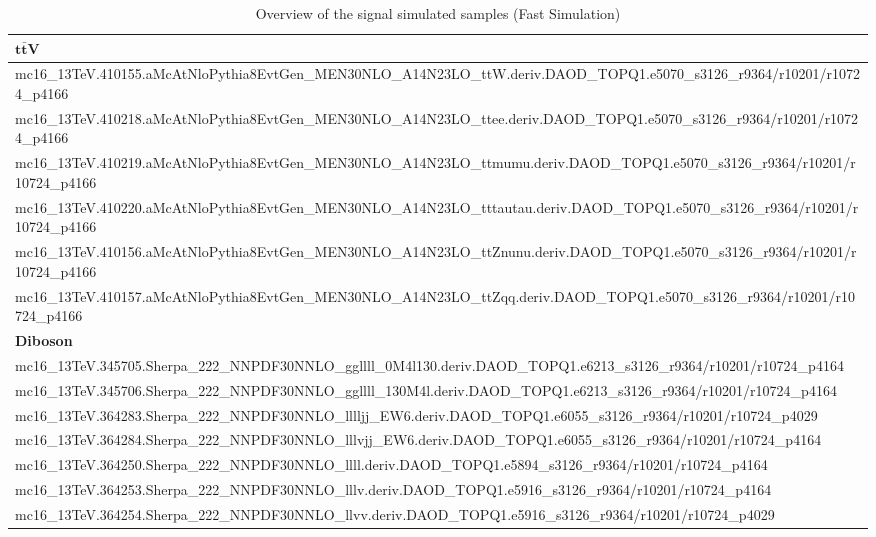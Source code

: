	\begin{table}[htbp]
	\caption {Overview of the signal simulated samples (Fast Simulation)}
	\label{tab:mc_bkg_nom}
		\notsotiny
		\centering
	\begin{adjustwidth}{-0.6cm}{}
			\begin{tabular}{l}
			\toprule	
			$\mathbf{t\bar{t}V}$ \\
			\hline
			mc16\_13TeV.410155.aMcAtNloPythia8EvtGen\_MEN30NLO\_A14N23LO\_ttW.deriv.DAOD\_TOPQ1.e5070\_s3126\_r9364/r10201/r10724\_p4166 \\
			mc16\_13TeV.410218.aMcAtNloPythia8EvtGen\_MEN30NLO\_A14N23LO\_ttee.deriv.DAOD\_TOPQ1.e5070\_s3126\_r9364/r10201/r10724\_p4166 \\
			mc16\_13TeV.410219.aMcAtNloPythia8EvtGen\_MEN30NLO\_A14N23LO\_ttmumu.deriv.DAOD\_TOPQ1.e5070\_s3126\_r9364/r10201/r10724\_p4166 \\
			mc16\_13TeV.410220.aMcAtNloPythia8EvtGen\_MEN30NLO\_A14N23LO\_tttautau.deriv.DAOD\_TOPQ1.e5070\_s3126\_r9364/r10201/r10724\_p4166 \\
			mc16\_13TeV.410156.aMcAtNloPythia8EvtGen\_MEN30NLO\_A14N23LO\_ttZnunu.deriv.DAOD\_TOPQ1.e5070\_s3126\_r9364/r10201/r10724\_p4166 \\
			mc16\_13TeV.410157.aMcAtNloPythia8EvtGen\_MEN30NLO\_A14N23LO\_ttZqq.deriv.DAOD\_TOPQ1.e5070\_s3126\_r9364/r10201/r10724\_p4166 \\
			\hline
			\textbf{Diboson} \\
			\hline
			mc16\_13TeV.345705.Sherpa\_222\_NNPDF30NNLO\_ggllll\_0M4l130.deriv.DAOD\_TOPQ1.e6213\_s3126\_r9364/r10201/r10724\_p4164 \\
			mc16\_13TeV.345706.Sherpa\_222\_NNPDF30NNLO\_ggllll\_130M4l.deriv.DAOD\_TOPQ1.e6213\_s3126\_r9364/r10201/r10724\_p4164 \\
			mc16\_13TeV.364283.Sherpa\_222\_NNPDF30NNLO\_lllljj\_EW6.deriv.DAOD\_TOPQ1.e6055\_s3126\_r9364/r10201/r10724\_p4029 \\
			mc16\_13TeV.364284.Sherpa\_222\_NNPDF30NNLO\_lllvjj\_EW6.deriv.DAOD\_TOPQ1.e6055\_s3126\_r9364/r10201/r10724\_p4164 \\
			mc16\_13TeV.364250.Sherpa\_222\_NNPDF30NNLO\_llll.deriv.DAOD\_TOPQ1.e5894\_s3126\_r9364/r10201/r10724\_p4164 \\
			mc16\_13TeV.364253.Sherpa\_222\_NNPDF30NNLO\_lllv.deriv.DAOD\_TOPQ1.e5916\_s3126\_r9364/r10201/r10724\_p4164 \\
			mc16\_13TeV.364254.Sherpa\_222\_NNPDF30NNLO\_llvv.deriv.DAOD\_TOPQ1.e5916\_s3126\_r9364/r10201/r10724\_p4029 \\

\end{tabular}
\end{adjustwidth}
\end{table}
